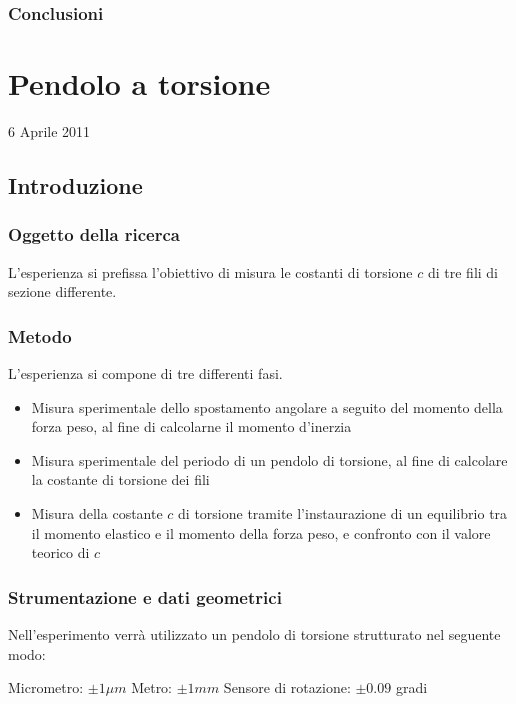 \documentclass[a4paper,10pt]{report}
\begin{document}
\subsection{Conclusioni}


\chapter{Pendolo a torsione}

6 Aprile 2011
\section{Introduzione}


\subsection{Oggetto della ricerca}
L'esperienza si prefissa l'obiettivo di misura le costanti di torsione $c$ di tre fili di sezione differente. 


\subsection{Metodo}
L'esperienza si compone di tre differenti fasi.
\begin{itemize}
\item Misura sperimentale dello spostamento angolare a seguito del momento della forza peso, al fine di calcolarne il momento d'inerzia 
\item Misura sperimentale del periodo di un pendolo di torsione, al fine di calcolare la costante di torsione dei fili
\item Misura della costante $c$ di torsione tramite l'instaurazione di un equilibrio tra il momento elastico e il momento della forza peso, e confronto con il valore teorico di $c$
\end{itemize}

\subsection{ Strumentazione e dati geometrici}

Nell'esperimento verrà utilizzato un pendolo di torsione strutturato nel seguente modo:


Micrometro: $ \pm 1 \mu m$
Metro: $\pm 1 mm$
Sensore di rotazione: $\pm 0.09$ gradi
\end{document}
